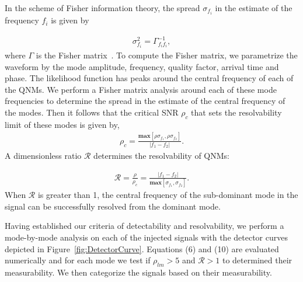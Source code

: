 In the scheme of Fisher information theory, the spread $\sigma_{f_{i}}$ in the estimate of the frequency $f_{i}$ is given by

\begin{align}
\sigma_{f_{i}}^{2}=\Gamma_{f_{i}f_{i}}^{-1},
\end{align}
where $\Gamma$ is the Fisher matrix~\cite{PhysRevD.46.5236}. To compute the Fisher matrix, we parametrize the waveform by the mode amplitude, frequency, quality factor, arrival time and phase. The likelihood function has peaks around the central frequency of each of the QNMs. We perform a Fisher matrix analysis around each of these mode frequencies to determine the spread in the estimate of the central frequency of the modes. Then it follows that the critical SNR $\rho_{c}$ that sets the resolvability limit of these modes is given by,
\begin{gather}
\rho_{c}=\frac{\textbf{max} [\rho \sigma_{f_{1}},\rho \sigma_{f_{2}}]}{|f_{1}-f_{2}|}.
\end{gather}
A dimensionless ratio $\mathcal{R}$ determines the resolvability of QNMs:

\begin{gather}
\mathcal{R}=\frac{\rho}{\rho_{c}}=\frac{|f_{1}-f_{2}|}{\textbf{max} [\sigma_{f_{1}}, \sigma_{f_{2}}]}.
\end{gather}
When $\mathcal{R}$ is greater than 1, the central frequency of the sub-dominant mode in the signal can be successfully resolved from the dominant mode. 

Having established our criteria of detectability and resolvability, we perform a mode-by-mode analysis on each of the injected signals with the detector curves depicted in Figure~\ref{fig:DetectorCurve}. Equations (6) and (10) are evaluated numerically and for each mode we test if $\rho_{lm} > 5$ and $\mathcal{R} > 1$ to determined their measurability. We then categorize the signals based on their measurability. 



